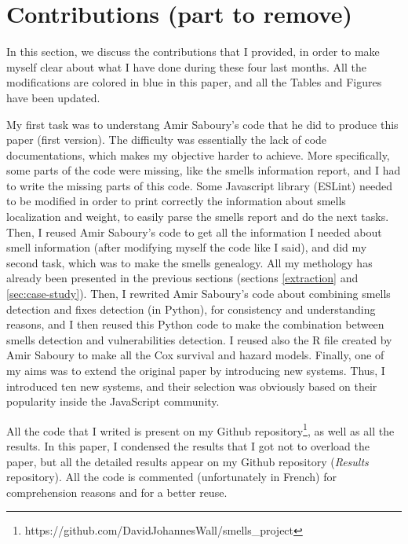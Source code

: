 \section{Contributions (part to remove)}\label{sec:contributions}
{\color{blue}In this section, we discuss the contributions that I provided, in order to make myself clear about what I have done during these four last months. All the modifications are colored in blue in this paper, and all the Tables and Figures have been updated.
	
My first task was to understang Amir Saboury's code that he did to produce this paper (first version). The difficulty was essentially the lack of code documentations, which makes my objective harder to achieve. More specifically, some parts of the code were missing, like the smells information report, and I had to write the missing parts of this code. Some Javascript library (ESLint) needed to be modified in order to print correctly the information about smells localization and weight, to easily parse the smells report and do the next tasks.
Then, I reused Amir Saboury's code to get all the information I needed about smell information (after modifying myself the code like I said), and did my second task, which was to make the smells genealogy. All my methology has already been presented in the previous sections (sections \ref{extraction} and \ref{sec:case-study}).
Then, I rewrited Amir Saboury's code about combining smells detection and fixes detection (in Python), for consistency and understanding reasons, and I then reused this Python code to make the combination between smells detection and vulnerabilities detection.
I reused also the R file created by Amir Saboury to make all the Cox survival and hazard models.
Finally, one of my aims was to extend the original paper by introducing new systems. Thus, I introduced ten new systems, and their selection was obviously based on their popularity inside the JavaScript community.

All the code that I writed is present on my Github repository\footnote{https://github.com/DavidJohannesWall/smells\_project}, as well as all the results. In this paper, I condensed the results that I got not to overload the paper, but all the detailed results appear on my Github repository (\textsl{Results} repository). All the code is commented (unfortunately in French) for comprehension reasons and for a better reuse.
}